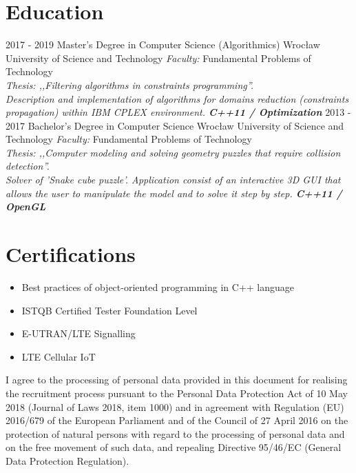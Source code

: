 \documentclass[tikz]{friggeri-cv}
\begin{document}
\section{Education}
\begin{entrylist}
  \entry
    {2017 - 2019}
    {Master's Degree in Computer Science (Algorithmics)}
    {Wrocław University of Science and Technology}
    {
      \emph{Faculty:} Fundamental Problems of Technology \\
      \emph{Thesis: ,,Filtering algorithms in constraints programming''.} \\
      \emph{Description and implementation of algorithms for domains reduction
            (constraints propagation) within IBM CPLEX environment. \textbf{C++11 / Optimization} }
    }
  \entry
    {2013 - 2017}
    {Bachelor's Degree in Computer Science}
    {Wrocław University of Science and Technology}
    {
      \emph{Faculty:} Fundamental Problems of Technology \\
      \emph{Thesis: ,,Computer modeling and solving geometry puzzles that require collision detection''.} \\
      \emph{Solver of 'Snake cube puzzle'. Application consist of an interactive 3D GUI that allows the user
            to manipulate the model and to solve it step by step. \textbf{C++11 / OpenGL} }
    }
\end{entrylist}

\section{Certifications}
\begin{itemize}
  \setlength\itemsep{-0.32em}
  \item {\small Best practices of object-oriented programming in C++ language}
  \item {\small ISTQB Certified Tester Foundation Level}
  \item {\small E-UTRAN/LTE Signalling}
  \item {\small LTE Cellular IoT}
\end{itemize}

\vspace{5mm}
{\scriptsize I agree to the processing of personal data provided in this document for realising
the recruitment process pursuant to the Personal Data Protection Act of 10 May 2018 (Journal of
Laws 2018, item 1000) and in agreement with Regulation (EU) 2016/679 of the European Parliament
and of the Council of 27 April 2016 on the protection of natural persons with regard to the
processing of personal data and on the free movement of such data, and repealing Directive 95/46/EC
(General Data Protection Regulation).}
\end{document}
